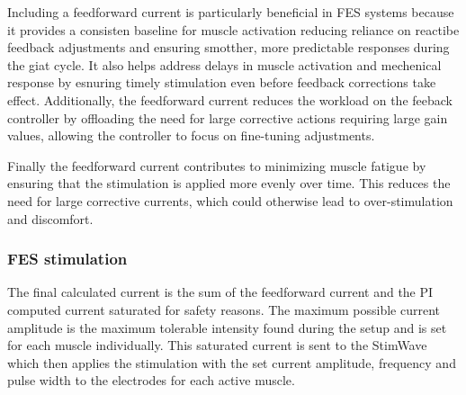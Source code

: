 
Including a feedforward current is particularly beneficial in FES systems because it provides a consisten baseline for muscle activation reducing reliance on reactibe feedback adjustments and ensuring smotther, more predictable responses during the giat cycle. It also helps address delays in muscle activation and mechenical response by esnuring timely stimulation even before feedback corrections take effect. Additionally, the feedforward current reduces the workload on the feeback controller by offloading the need for large corrective actions requiring large gain values, allowing the controller to focus on fine-tuning adjustments.

Finally the feedforward current contributes to minimizing muscle fatigue by ensuring that the stimulation is applied more evenly over time. This reduces the need for large corrective currents, which could otherwise lead to over-stimulation and discomfort.


\subsubsection{FES stimulation}
The final calculated current is the sum of the feedforward current and the PI computed current saturated for safety reasons. The maximum possible current amplitude is the maximum tolerable intensity found during the setup and is set for each muscle individually. This saturated current is sent to the StimWave which then applies the stimulation with the set current amplitude, frequency and pulse width to the electrodes for each active muscle.


























 





































